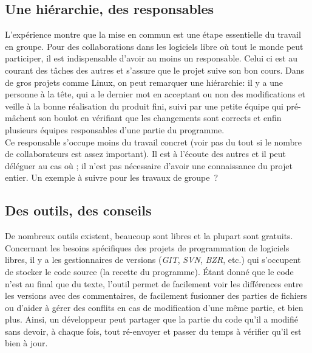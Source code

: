 \subsection*{Une hiérarchie, des responsables}
L'expérience montre que la mise en commun est une étape essentielle du travail en groupe. Pour des collaborations dans les logiciels libre où tout le monde peut participer, il est indispensable d'avoir au moins un responsable. Celui ci est au courant des tâches des autres et s'assure que le projet suive son bon cours.
Dans de gros projets comme Linux, on peut remarquer une hiérarchie: il y a une personne à la tête, qui a le dernier mot en acceptant ou non des modifications et veille à la bonne réalisation du produit fini, suivi par une petite équipe qui pré-mâchent son boulot en vérifiant que les changements sont corrects et enfin plusieurs équipes responsables d'une partie du programme.\\

Ce responsable s'occupe moins du travail concret (voir pas du tout si le nombre de collaborateurs est assez important). Il est à l'écoute des autres et il peut déléguer au cas où ; il n'est pas nécessaire d'avoir une connaissance du projet entier.
Un exemple à suivre pour les travaux de groupe~?

\subsection*{Des outils, des conseils}
De nombreux outils existent, beaucoup sont libres et la plupart sont gratuits.
Concernant les besoins spécifiques des projets de programmation de logiciels libres, il y a les gestionnaires de versions (\textit{GIT}, \textit{SVN}, \textit{BZR}, etc.) qui s'occupent de stocker le code source (la recette du programme). Étant donné que le code n'est au final que du texte, l'outil permet de facilement voir les différences entre les versions avec des commentaires, de facilement fusionner des parties de fichiers ou d'aider à gérer des conflits en cas de modification d'une même partie, et bien plus. Ainsi, un développeur peut partager que la partie du code qu'il a modifié sans devoir, à chaque fois, tout ré-envoyer et passer du temps à vérifier qu'il est bien à jour.\\

